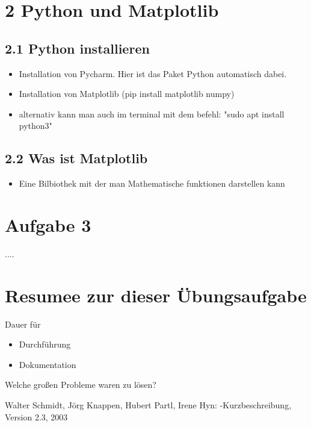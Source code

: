 \documentclass[a4paper,11pt,titlepage]{article}
\begin{document}
\section{2 Python und Matplotlib}
\subsection{2.1 Python installieren}
\begin{itemize}
  \item Installation von Pycharm. Hier ist das Paket Python automatisch dabei.
  \item Installation von Matplotlib (pip install matplotlib numpy)
  \item alternativ kann man auch im terminal mit dem befehl: "sudo apt install python3"
\end{itemize}
\subsection{2.2 Was ist Matplotlib}
\begin{itemize}
  \item Eine Bilbiothek mit der man Mathematische funktionen darstellen kann
\end{itemize}

\section{Aufgabe 3}
....

\section{Resumee zur dieser \"Ubungsaufgabe}
Dauer f\"ur 
\begin{itemize}
	\item Durchf\"uhrung
	\item Dokumentation
\end{itemize}
Welche großen Probleme waren zu l\"osen?

\begin{thebibliography}{99}
	Walter Schmidt, J\"org Knappen, Hubert Partl, Irene Hyn: 
\LaTeXe-Kurzbeschreibung, 	Version 2.3, 2003
	

\end{thebibliography}
\end{document}
